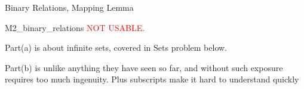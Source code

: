\documentclass[quiz]{mcs}
\begin{document}



\iffalse
\begin{center}
{\Large DRAFT}
\end{center}
\fi

\begin{staffnotes}
\begin{center}
{\large Binary Relations, Mapping Lemma}
\end{center}
\end{staffnotes}


%



\begin{staffnotes}

M2\_binary\_relations \textcolor{red}{NOT USABLE.}

Part(a) is about infinite sets, covered in Sets problem below.

Part(b) is unlike anything they have seen so far, and without such
exposure requires too much ingenuity.  Plus subscripts make it hard to
understand quickly

\end{staffnotes}


\end{document}
